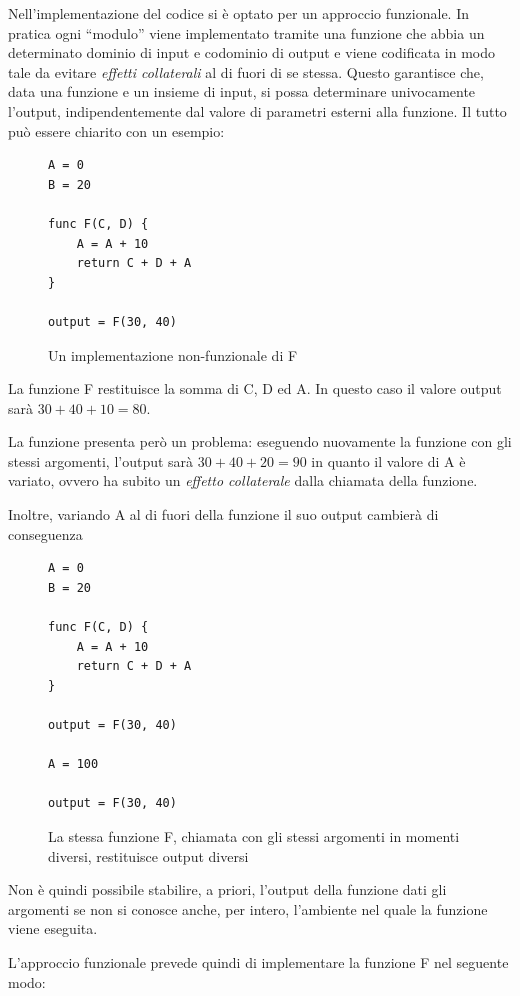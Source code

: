 \documentclass[11pt,a4paper]{report}
\newcommand{\name}[1]{{\ttfamily #1}}
\begin{document}
Nell'implementazione del codice si è optato per un approccio funzionale. In pratica ogni ``modulo'' viene implementato tramite una funzione che abbia un determinato dominio di input e codominio di output e viene codificata in modo tale da evitare \textit{effetti collaterali} al di fuori di se stessa. Questo garantisce che, data una funzione e un insieme di input, si possa determinare univocamente l'output, indipendentemente dal valore di parametri esterni alla funzione. Il tutto può essere chiarito con un esempio:

\begin{figure}[H]
\begin{lstlisting}
A = 0
B = 20

func F(C, D) {
	A = A + 10
	return C + D + A
}

output = F(30, 40)
\end{lstlisting}
\caption{Un implementazione non-funzionale di \name{F}}
\end{figure}

La funzione \name{F} restituisce la somma di \name{C}, \name{D} ed \name{A}. In questo caso il valore \name{output} sarà $30 + 40 + 10 = 80$.

La funzione presenta però un problema: eseguendo nuovamente la funzione con gli stessi argomenti, l'output sarà $30 + 40 + 20 = 90$ in quanto il valore di \name{A} è variato, ovvero ha subito un \textit{effetto collaterale} dalla chiamata della funzione.

Inoltre, variando \name{A} al di fuori della funzione il suo output cambierà di conseguenza

\begin{figure}[H]
\begin{lstlisting}
A = 0
B = 20

func F(C, D) {
	A = A + 10
	return C + D + A
}

output = F(30, 40)

A = 100

output = F(30, 40)
\end{lstlisting}
\caption{La stessa funzione \name{F}, chiamata con gli stessi argomenti in momenti diversi, restituisce output diversi}
\end{figure}

Non è quindi possibile stabilire, a priori, l'output della funzione dati gli argomenti se non si conosce anche, per intero, l'ambiente nel quale la funzione viene eseguita.

L'approccio funzionale prevede quindi di implementare la funzione \name{F} nel seguente modo:
\end{document}
